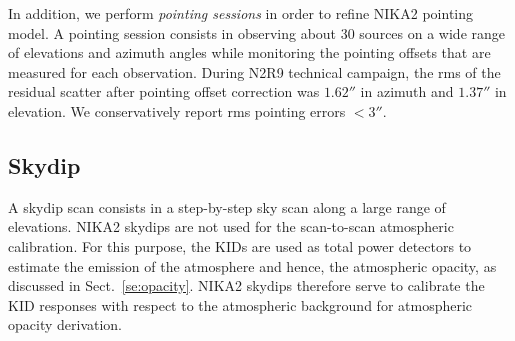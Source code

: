 {\lp In addition, we perform \emph{pointing sessions} in order to
refine NIKA2 pointing model. A pointing session consists in observing
about 30 sources on a wide range of elevations and azimuth angles while
monitoring the pointing offsets that are measured for each
observation. During N2R9 technical campaign, the rms of
the residual scatter after pointing offset correction was $1.62''$ in
azimuth and $1.37''$ in elevation. We conservatively report rms pointing errors $<3''$.}




\subsection{Skydip}
\label{se:skydip}

A skydip scan consists in a step-by-step sky scan along a large range
of elevations.
{\lp NIKA2 skydips are not used for the scan-to-scan atmospheric 
calibration. For this purpose, the KIDs are used as total power
detectors to estimate the emission of the atmosphere and hence, the
atmospheric opacity, as discussed in Sect.~\ref{se:opacity}. 
NIKA2 skydips therefore serve to calibrate the KID responses with
respect to the atmospheric background for atmospheric opacity
derivation.}

